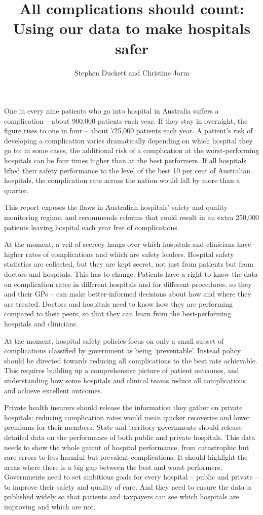 \documentclass[FrontPage]{grattan}
\title{All complications should count: Using our data to make hospitals safer}
\author{Stephen Duckett and Christine Jorm}
\begin{document}
\begin{overview}
One in every nine patients who go into hospital in Australia suffers a complication -- about 900,000 patients each year.
If they stay in overnight, the figure rises to one in four -- about 725,000 patients each year.
A patient's risk of developing a complication varies dramatically depending on which hospital they go to: in some cases, the additional risk of a complication at the worst-performing hospitals can be four times higher than at the best performers.
If all hospitals lifted their safety performance to the level of the best 10 per cent of Australian hospitals, the complication rate across the nation would fall by more than a quarter.

This report exposes the flaws in Australian hospitals' safety and quality monitoring regime, and recommends reforms that could result in an extra 250,000 patients leaving hospital each year free of complications.

At the moment, a veil of secrecy hangs over which hospitals and clinicians have higher rates of complications and which are safety leaders.
Hospital safety statistics are collected, but they are kept secret, not just from patients but from doctors and hospitals.
This has to change.
Patients have a right to know the data on complication rates in different hospitals and for different procedures, so they -- and their GPs -- can make better-informed decisions about how and where they are treated.
Doctors and hospitals need to know how they are performing compared to their peers, so that they can learn from the best-performing hospitals and clinicians.

At the moment, hospital safety policies focus on only a small subset of complications classified by government as being `preventable'.
Instead policy should be directed towards reducing all complications to the best rate achievable.
This requires building up a comprehensive picture of patient outcomes, and understanding how some hospitals and clinical teams reduce all complications and achieve excellent outcomes.

Private health insurers should release the information they gather on private hospitals: reducing complication rates would mean quicker recoveries and lower premiums for their members.
State and territory governments should release detailed data on the performance of both public and private hospitals.
This data needs to show the whole gamut of hospital performance, from catastrophic but rare errors to less harmful but prevalent complications.
It should highlight the areas where there is a big gap between the best and worst performers.
Governments need to set ambitious goals for every hospital -- public and private -- to improve their safety and quality of care.
And they need to ensure the data is published widely so that patients and taxpayers can see which hospitals are improving and which are not.
\end{overview}
\end{document}
